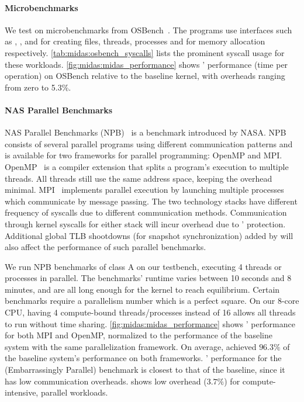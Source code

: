 \paragraph{Microbenchmarks}
We test \midas on microbenchmarks from
OSBench~\cite{osbench}.
The programs use  interfaces such as ,
,  and  for creating files,
threads, processes and for memory allocation respectively.
\autoref{tab:midas:osbench_syscalls} lists the prominent syscall usage
for these workloads.
\autoref{fig:midas:midas_performance} shows \midas' performance
(time per operation)
on OSBench relative to the baseline kernel, with overheads ranging from
zero to 5.3\%.

\paragraph{NAS Parallel Benchmarks}
NAS Parallel Benchmarks (NPB)~\cite{npb} is a benchmark introduced by
NASA.
NPB consists of several parallel programs using different communication
patterns and is available for two frameworks for parallel programming:
OpenMP and MPI.
OpenMP~\cite{dagum1998openmp} is a compiler extension that splits a
program's execution to multiple threads.
All threads still use the same address space, keeping the overhead minimal.
MPI~\cite{snir1998mpi} implements parallel execution by launching multiple
processes which communicate by message passing.
The two technology stacks have different frequency of syscalls due to
different communication methods.
Communication through kernel syscalls for either stack will incur overhead
due to \midas' protection.
Additional global TLB shootdowns (for snapshot synchronization) added by
\midas will also affect the performance of such parallel benchmarks.

We run NPB benchmarks of class A on our testbench, executing
4 threads or processes in parallel.
The benchmarks' runtime varies between 10 seconds and 8 minutes,
and are all long enough for the kernel to reach equilibrium.
Certain benchmarks require a parallelism number which is a perfect square.
On our 8-core CPU, having 4 compute-bound threads/processes instead of 16 allows
all threads to run without time sharing.
\autoref{fig:midas:midas_performance} shows \midas' performance for both MPI and OpenMP,
normalized to the performance of the baseline system with the same parallelization
framework.
On average, \midas achieved $96.3\%$ of the baseline system's performance on
both frameworks.
\midas' performance for the  (Embarrassingly Parallel) benchmark is
closest to that of the baseline, since it has low communication overheads.
\midas shows low overhead ($3.7\%$) for compute-intensive, parallel workloads.


